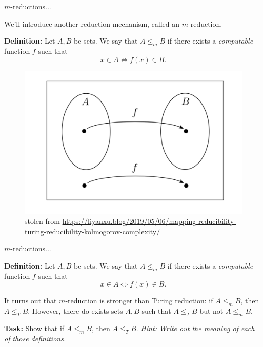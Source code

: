 \documentclass{beamer}
\begin{document}
\begin{frame}{$m$-reductions...}

We'll introduce another reduction mechanism, called an $m$-reduction.

\textbf{Definition:} Let $A, B$ be sets. We say that $A \leq_m B$ if there exists a \textit{computable} function $f$ such that 
$$x \in A \Leftrightarrow f(x) \in B.$$

\begin{figure}[h]
    \centering
    \includegraphics[scale=0.3]{img/mapping_reduc.png}
    \caption*{\tiny{stolen from \url{https://liyanxu.blog/2019/05/06/mapping-reducibility-turing-reducibility-kolmogorov-complexity/}}}
\end{figure}

\end{frame}

\begin{frame}{$m$-reductions...}

\textbf{Definition:} Let $A, B$ be sets. We say that $A \leq_m B$ if there exists a \textit{computable} function $f$ such that 
$$x \in A \Leftrightarrow f(x) \in B.$$

\vspace{2mm}

It turns out that $m$-reduction is stronger than Turing reduction: if $A \leq_m B$, then $A \leq_T B$. However, there do exists sets $A, B$ such that $A \leq_T B$ but not $A \leq_m B$.

\pause
\vspace{2mm}

\textbf{Task:} Show that if $A \leq_m B$, then $A \leq_T B$. \textit{Hint: Write out the meaning of each of those definitions.}

\end{frame}
\end{document}
